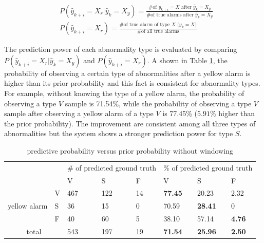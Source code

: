 \begin{align}
\nonumber 
&P(\hat{y}_{k+i}=X_r|\hat{y}_{k}=X_y)=\frac{\text{\# of $y_{k+i}=X$ after $\hat{y}_k=X_y$}}{\text{\# of true alarms after $\hat{y}_k=X_y$}} \\
&P(\hat{y}_{k+i}=X_r)=\frac{\text{\# of true alarm of type $X$ ($y_{k}=X$)}}{\text{\# of all true alarms}} 
\end{align}

The prediction power of each abnormality type is evaluated by comparing $P(\hat{y}_{k+i}=X_r|\hat{y}_{k}=X_y)$ and $P(\hat{y}_{k+i}=X_r)$. A shown in Table \ref{table:pred}, the probability of observing a certain type of abnormalities after a yellow alarm is higher than its prior probability and this fact is consistent for abnormality types. For example, without knowing the type of a yellow alarm, the probability of observing a type $V$ sample is 71.54\%, while the probability of observing a type $V$ sample after observing a yellow alarm of a type $V$ is 77.45\% ($5.91\%$ higher than the prior probability). The improvement are consistent among all three types of abnormalities but the system shows a stronger prediction power for type $S$. 

\begin{table}[t]
\centering
\caption{predictive probability versus prior probability without windowing}
\label{table:pred}
\begin{tabular}{|c|l|l|l|l||l|l|l|}
\hline
\multicolumn{2}{|l|}{\multirow{2}{*}{}} & \multicolumn{3}{l|}{\# of predicted ground truth} & \multicolumn{3}{l|}{\% of predicted ground truth} \\ \cline{3-8} 
\multicolumn{2}{|l|}{}                  & V               & S               & F             & V               & S               & F             \\ \hline
\multirow{3}{*}{yellow alarm}    & V    & 467             & 122              & 14            & \textbf{77.45}  & 20.23           & 2.32          \\ \cline{2-8} 
                                 & S    & 36              & 15              & 0             & 70.59           & \textbf{28.41}  & 0             \\ \cline{2-8} 
                                 & F    & 40              & 60              & 5             & 38.10           & 57.14           & \textbf{4.76} \\ \hline
\multicolumn{2}{|c|}{total}             & 543             & 197             & 19            & \textbf{71.54}  & \textbf{25.96}  & \textbf{2.50} \\ \hline
\end{tabular}
\end{table}

